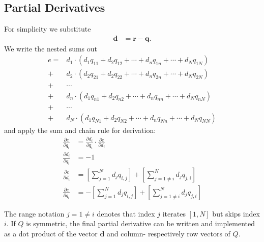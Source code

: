 \subsection{Partial Derivatives}
For simplicity we substitute
\begin{align}
\mathbf{d} &= \mathbf{r} - \mathbf{q}.
\end{align}
%
We write the nested sums out
\begin{align}
e=& d_1 \cdot (d_1 q_{11} + d_2 q_{12} + \cdots + d_n q_{1n} + \cdots + d_N q_{1N}) \nonumber\\
+& d_2 \cdot (d_2 q_{21} + d_2 q_{22} + \cdots + d_n q_{2n} + \cdots + d_N q_{2N}) \nonumber\\
+& \cdots \nonumber\\
+& d_n \cdot (d_1 q_{n1} + d_2 q_{n2} + \cdots + d_n q_{nn} + \cdots + d_N q_{nN}) \nonumber\\
+& \cdots \nonumber\\
+& d_N \cdot (d_1 q_{N1} + d_2 q_{N2} + \cdots + d_n q_{Nn} + \cdots + d_N q_{NN})
\end{align}
%
and apply the sum and chain rule for derivation:
\begin{align}
\frac{\partial e}{\partial q_i} &= \frac{\partial d_i}{\partial q_i} \cdot \frac{\partial e}{\partial d_i} \\
\frac{\partial d_i}{\partial q_i} &= -1 \nonumber\\
\frac{\partial e}{\partial d_i} &= \left[ \sum_{j=1}^N d_jq_{i,j}\right] + \left[ \sum_{j=1 \neq i}^N d_jq_{j,i}\right] \\
\frac{\partial e}{\partial q_i} &= - \left[ \sum_{j=1}^N d_jq_{i,j}\right] + \left[ \sum_{j=1 \neq i}^N d_jq_{j,i}\right]
\end{align}

The range notation $j=1 \neq i$ denotes that index $j$ iterates $[1,N]$ but skips index $i$.
If $Q$ is symmetric, the final partial derivative can be written and implemented as a dot product of the vector $\mathbf{d}$ and column- respectively row vectors of $Q$.
